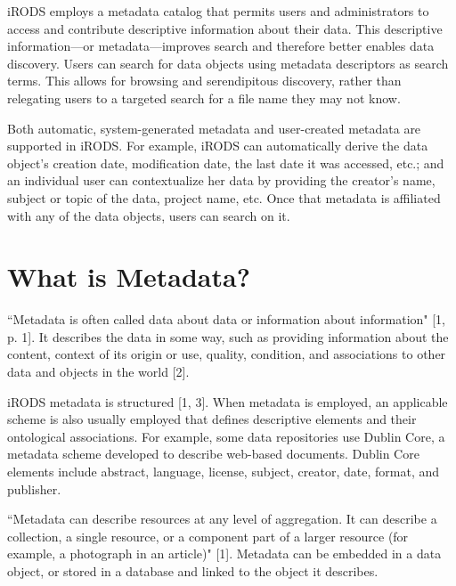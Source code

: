 \documentclass[10pt,oneside]{memoir}
\begin{document}
iRODS employs a metadata catalog that permits users and administrators to access and contribute descriptive information about their data. This descriptive information---or metadata---improves search and therefore better enables data discovery. Users can search for data objects using metadata descriptors as search terms. This allows for browsing and serendipitous discovery, rather than relegating users to a targeted search for a file name they may not know.

Both automatic, system-generated metadata and user-created metadata are supported in iRODS. For example, iRODS can automatically derive the data object's creation date, modification date, the last date it was accessed, etc.; and an individual user can contextualize her data by providing the creator's name, subject or topic of the data, project name, etc. Once that metadata is affiliated with any of the data objects, users can search on it.

\section{What is Metadata?}

``Metadata is often called data about data or information about information" [1, p. 1]. It describes the data in some way, such as providing information about the content, context of its origin or use, quality, condition, and associations to other data and objects in the world [2].

iRODS metadata is structured [1, 3]. When metadata is employed, an applicable scheme is also usually employed that defines descriptive elements and their ontological associations. For example, some data repositories use Dublin Core, a metadata scheme developed to describe web-based documents. Dublin Core elements include abstract, language, license, subject, creator, date, format, and publisher.

``Metadata can describe resources at any level of aggregation. It can describe a collection, a single resource, or a component part of a larger resource (for example, a photograph in an article)" [1]. Metadata can be embedded in a data object, or stored in a database and linked to the object it describes.
\end{document}
